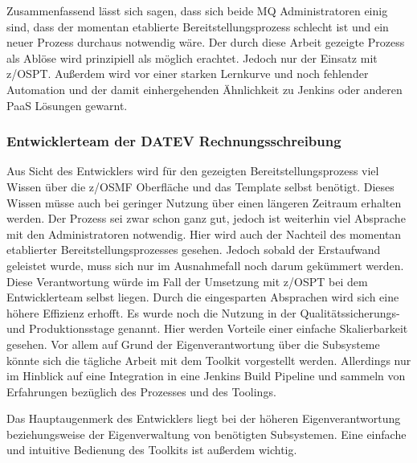 Zusammenfassend lässt sich sagen, dass sich beide MQ Administratoren einig sind, dass der momentan etablierte Bereitstellungsprozess schlecht ist und ein neuer Prozess durchaus notwendig wäre.
Der durch diese Arbeit gezeigte Prozess als Ablöse wird prinzipiell als möglich erachtet.
Jedoch nur der Einsatz mit z/OSPT.
Außerdem wird vor einer starken Lernkurve und noch fehlender Automation und der damit einhergehenden Ähnlichkeit zu Jenkins oder anderen PaaS Lösungen gewarnt.

\subsubsection{Entwicklerteam der DATEV Rechnungsschreibung}
Aus Sicht des Entwicklers wird für den gezeigten Bereitstellungsprozess viel Wissen über die z/OSMF Oberfläche und das Template selbst benötigt.
Dieses Wissen müsse auch bei geringer Nutzung über einen längeren Zeitraum erhalten werden.
Der Prozess sei zwar schon ganz gut, jedoch ist weiterhin viel Absprache mit den Administratoren notwendig.
Hier wird auch der Nachteil des momentan etablierter Bereitstellungsprozesses gesehen.
Jedoch sobald der Erstaufwand geleistet wurde, muss sich nur im Ausnahmefall noch darum gekümmert werden.
Diese Verantwortung würde im Fall der Umsetzung mit z/OSPT bei dem Entwicklerteam selbst liegen.
Durch die eingesparten Absprachen wird sich eine höhere Effizienz erhofft.
Es wurde noch die Nutzung in der Qualitätssicherungs- und Produktionsstage genannt.
Hier werden Vorteile einer einfache Skalierbarkeit gesehen.
Vor allem auf Grund der Eigenverantwortung über die Subsysteme könnte sich die tägliche Arbeit mit dem Toolkit vorgestellt werden.
Allerdings nur im Hinblick auf eine Integration in eine Jenkins Build Pipeline und sammeln von Erfahrungen bezüglich des Prozesses und des Toolings.

Das Hauptaugenmerk des Entwicklers liegt bei der höheren Eigenverantwortung beziehungsweise der Eigenverwaltung von benötigten Subsystemen.
Eine einfache und intuitive Bedienung des Toolkits ist außerdem wichtig.

